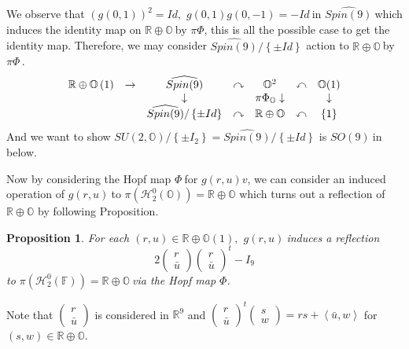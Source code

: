 \documentclass[a4paper]{article}%
\newtheorem{proposition}[theorem]{Proposition}
\begin{document}
We observe that $\left(  g\left(  0,1\right)  \right)  ^{2}=Id,$ $g\left(
0,1\right)  g\left(  0,-1\right)  =-Id\ $in $\widehat{Spin(9)}\ $which induces
the identity map on $\mathbb{R\oplus O\ }$by $\pi\Phi$, this is all the
possible case to get the identity map. Therefore, we may consider
$\widehat{Spin(9)}/\left\{  \pm Id\right\}  $ action to $\mathbb{R\oplus O\ }%
$by $\pi\Phi\,.$%
\[%
\begin{array}
[c]{ccccccc}%
\mathbb{R\oplus O}\left(  1\right)  & \rightarrow & \widehat{Spin(9)} &
\curvearrowright & \mathbb{O}^{2} & \curvearrowleft & \mathbb{O}(1)\\
&  & \downarrow &  & \pi\Phi_{\mathbb{O}}\downarrow &  & \downarrow\\
&  & \widehat{Spin(9)}/\left\{  \pm Id\right\}  & \curvearrowright &
\mathbb{R}\oplus\mathbb{O} & \curvearrowleft & \left\{  1\right\}
\end{array}
\]
And we want to show $SU(2,\mathbb{O})/\left\{  \pm I_{2}\right\}
=\widehat{Spin(9)}/\left\{  \pm Id\right\}  $ is $SO\left(  9\right)  \ $in below.

Now by considering the Hopf map $\Phi\ $for $g\left(  r,u\right)  v$, we can
consider an induced operation of $g\left(  r,u\right)  \ $to $\pi\left(
\mathcal{H}_{2}^{0}(\mathbb{O})\right)  =\mathbb{R\oplus O}$ which turns out a
reflection of $\mathbb{R\oplus O}$ by following Proposition.

\begin{proposition}
\label{OcRefProp}For each $\left(  r,u\right)  \in\mathbb{R\oplus O}\left(
1\right)  ,$ $g\left(  r,u\right)  \ $induces a reflection
\[
2%
\begin{pmatrix}
r\\
\bar{u}%
\end{pmatrix}%
\begin{pmatrix}
r\\
\bar{u}%
\end{pmatrix}
^{t}-I_{9}%
\]
to $\pi\left(  \mathcal{H}_{2}^{0}(\mathbb{F})\right)  =\mathbb{R\oplus O}%
\ $via the Hopf map $\Phi$.
\end{proposition}

\bigskip Note that $%
\begin{pmatrix}
r\\
\bar{u}%
\end{pmatrix}
$ is considered in $\mathbb{R}^{9}$ and $%
\begin{pmatrix}
r\\
\bar{u}%
\end{pmatrix}
^{t}%
\begin{pmatrix}
s\\
w
\end{pmatrix}
=rs+\left\langle \bar{u},w\right\rangle $ for $\left(  s,w\right)
\in\mathbb{R\oplus O}$.
\end{document}
